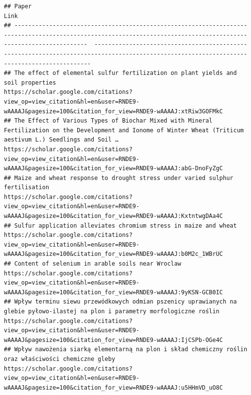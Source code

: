 \documentclass[
  12pt,
]{article}
\begin{document}
\begin{verbatim}
## Paper                                                                                                                                                              Link
## -----------------------------------------------------------------------------------------------------------------------------------------------------------------  -------------------------------------------------------------------------------------------------------------------------------------------
## The effect of elemental sulfur fertilization on plant yields and soil properties                                                                                   https://scholar.google.com/citations?view_op=view_citation&hl=en&user=RNDE9-wAAAAJ&pagesize=100&citation_for_view=RNDE9-wAAAAJ:xtRiw3GOFMkC
## The Effect of Various Types of Biochar Mixed with Mineral Fertilization on the Development and Ionome of Winter Wheat (Triticum aestivum L.) Seedlings and Soil …  https://scholar.google.com/citations?view_op=view_citation&hl=en&user=RNDE9-wAAAAJ&pagesize=100&citation_for_view=RNDE9-wAAAAJ:abG-DnoFyZgC
## Maize and wheat response to drought stress under varied sulphur fertilisation                                                                                      https://scholar.google.com/citations?view_op=view_citation&hl=en&user=RNDE9-wAAAAJ&pagesize=100&citation_for_view=RNDE9-wAAAAJ:KxtntwgDAa4C
## Sulfur application alleviates chromium stress in maize and wheat                                                                                                   https://scholar.google.com/citations?view_op=view_citation&hl=en&user=RNDE9-wAAAAJ&pagesize=100&citation_for_view=RNDE9-wAAAAJ:b0M2c_1WBrUC
## Content of selenium in arable soils near Wroclaw                                                                                                                   https://scholar.google.com/citations?view_op=view_citation&hl=en&user=RNDE9-wAAAAJ&pagesize=100&citation_for_view=RNDE9-wAAAAJ:9yKSN-GCB0IC
## Wpływ terminu siewu przewódkowych odmian pszenicy uprawianych na glebie pyłowo-ilastej na plon i parametry morfologiczne roślin                                    https://scholar.google.com/citations?view_op=view_citation&hl=en&user=RNDE9-wAAAAJ&pagesize=100&citation_for_view=RNDE9-wAAAAJ:IjCSPb-OGe4C
## Wpływ nawożenia siarką elementarną na plon i skład chemiczny roślin oraz właściwości chemiczne gleby                                                               https://scholar.google.com/citations?view_op=view_citation&hl=en&user=RNDE9-wAAAAJ&pagesize=100&citation_for_view=RNDE9-wAAAAJ:u5HHmVD_uO8C

\end{verbatim}
\end{document}
